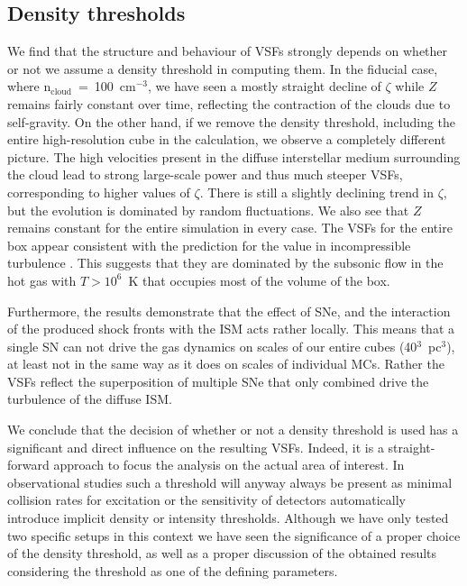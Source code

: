 \subsection{Density thresholds}\label{discussion:densthres}

We find that the structure and behaviour of VSFs strongly depends on whether or not we assume a density threshold in computing them.
In the fiducial case, where n$_\mathrm{cloud}$~=~100~cm$^{-3}$, we have seen a mostly straight decline of $\zeta$ while $Z$ remains fairly constant over time, reflecting the contraction of the clouds due to self-gravity.
On the other hand, if we remove the density threshold, including the entire high-resolution cube in the calculation, we observe a completely different picture.
The high velocities present in the diffuse interstellar medium surrounding the cloud lead to strong large-scale power and thus much steeper VSFs, corresponding to higher values of $\zeta$. 
There is still a slightly declining trend in $\zeta$, but the evolution is dominated by random fluctuations.
We also see that $Z$ remains constant for the entire simulation in every case.
The VSFs for the entire box appear consistent with the prediction for the value in incompressible turbulence \citep{Boldyrev2002}. 
This suggests that they are dominated by the subsonic flow in the hot gas with $T > 10^6$~K that occupies most of the volume of the box.

Furthermore, the results demonstrate that the effect of SNe, and the interaction of the produced shock fronts with the ISM acts rather locally. 
This means that a single SN can not drive the gas dynamics on scales of our entire cubes (40$^3$~pc$^3$), at least not in the same way as it does on scales of individual MCs.
Rather the VSFs reflect the superposition of multiple SNe that only combined drive the turbulence of the diffuse ISM.

We conclude that the decision of whether or not a density threshold is used has a significant and direct influence on the resulting VSFs.
Indeed, it is a straight-forward approach to focus the analysis on the actual area of interest.
In observational studies such a threshold will anyway always be present as minimal collision rates for excitation or the sensitivity of detectors automatically introduce implicit density or intensity thresholds. 
Although we have only tested two specific setups in this context we have seen the significance of a proper choice of the density threshold, as well as a proper discussion of the obtained results considering the threshold as one of the defining parameters.




